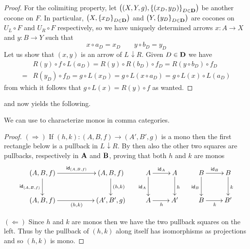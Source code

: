 \documentclass[3p]{elsarticle}
\def\B{\textbf {\textup{B}}}
\def\D{\textbf {\textup{D}}}
\def\A{\textbf {\textup{A}}}
\renewcommand{\comma}[2]{#1\hspace{1pt} {\downarrow}#2}
\newcommand{\id}[1]{\mathsf{id}_{#1}}
\theoremstyle{remark}
\theoremstyle{definition}
\begin{document}
\begin{proof}
	For the colimiting property, let $\left((X, Y, g), \left\{\left(x_D, y_D\right)\right\}_{D\in \D}\right)$ be another cocone on $F$. In particular, $\left(X, \left\{x_D\right\}_{D\in \D}\right)$ and $\left(Y, \left\{y_D\right\}_{D\in \D}\right)$ are cocones on $U_L\circ F$ and $U_R\circ F$ respectively, so we have uniquely determined arrows $x\colon A\rightarrow X$ and $y\colon B\rightarrow Y$ such that 
	\[x\circ a_D= x_D \qquad y\circ b_D= y_D\]
	Let us show that $(x,y)$ is an arrow of $\comma{L}{R}$. Given $D\in \D$ we have
	\begin{align*}
		&R(y)\circ f\circ L(a_D)=R(y)\circ R\left(b_D\right)\circ f_D=R\left(y\circ b_D\right)\circ f_D\\=&R\left(y_D\right)\circ f_D= g\circ L\left(x_D\right)=g\circ L\left(x\circ a_D\right)=g\circ L(x)\circ L\left(a_D\right)
	\end{align*}
	from which it follows  that $g\circ L(x)=R(y)\circ f$ as wanted.
\end{proof} 


 and  now yields the following.

We can use  to characterize monos in comma categories. 
\begin{proof}
	$(\Rightarrow)$  If $(h,k)\colon (A,B,f)\to (A', B', g)$ is a mono then the first rectangle below is a pullback in $\comma{L}{R}$. By  then also the other two squares are pullbacks, respectively in $\A$ and $\B$, proving that both $h$ and $k$ are monos
	\[\xymatrix{(A, B, f)  \ar[rr]^{\id{(A,B,f)}} \ar[d]_{\id{(A,B,f)}}&& (A, B, f)  \ar[d]^{(h,k)}& A \ar[r]^{\id{A}} \ar[d]_{\id{A}} & A \ar[d]^{h} & B \ar[r]^{\id{B}} \ar[d]_{\id{B}} & B  \ar[d]^{k}\\ (A, B, f)  \ar[rr]_{(h,k)}&& (A', B', g) &A \ar[r]_{h} & A' & B \ar[r]_{k} & B'}\]
	
\newpage
	\smallskip\noindent 
	\parbox{4cm}{ \xymatrix{A \ar[r]^{\id{A}} \ar[d]_{\id{A}} & A \ar[d]^{h} & B \ar[r]^{\id{B}} \ar[d]_{\id{B}} & B  \ar[d]^{k}\\ A \ar[r]_{h} & A' & B \ar[r]_{k} & B'}}\hfill \parbox{8.5cm}{$(\Leftarrow)$ Since $h$ and $k$ are monos then we have the two pullback squares on the left. Thus by  the pullback of $(h,k)$ along itself has isomorphisms as projections and so $(h,k)$ is mono. \qedhere}
	
\end{proof}
\end{document}

